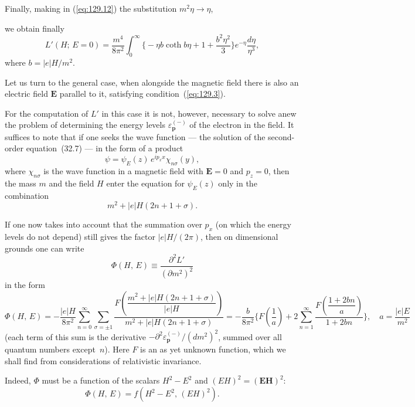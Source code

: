 Finally, making in (\ref{eq:129.12}) the substitution $m^2\eta\to\eta$,


\noindent we obtain finally
\begin{equation}
L'(H;\,E=0) = \frac{m^4}{8\pi^2}\int_0^{\infty}\biggl\{-\eta b\coth b\eta + 1 + \frac{b^2\eta^2}{3}\biggr\}e^{-\eta}\frac{d\eta}{\eta^3},
\label{eq:129.13}
\end{equation}
where $b = |e|H/m^2$.

Let us turn to the general case, when alongside the magnetic field there is also an electric field $\mathbf{E}$ parallel to it, satisfying condition~(\ref{eq:129.3}).

For the computation of $L'$ in this case it is not, however, necessary to solve anew the problem of determining the energy levels $\varepsilon_{\mathbf{p}}^{(-)}$ of the electron in the field. It suffices to note that if one seeks the wave function --- the solution of the second-order equation~(32.7) --- in the form of a product
\[
\psi = \psi_E(z)\,e^{ip_x x}\chi_{n\sigma}(y),
\]
where $\chi_{n\sigma}$ is the wave function in a magnetic field with $\mathbf{E}=0$ and $p_z = 0$, then the mass $m$ and the field $H$ enter the equation for $\psi_E(z)$ only in the combination
\[
m^2 + |e|H(2n+1+\sigma).
\]

If one now takes into account that the summation over $p_x$ (on which the energy levels do not depend) still gives the factor $|e|H/(2\pi)$, then on dimensional grounds one can write
\[
\Phi(H,\,E) \equiv \frac{\partial^2 L'}{(\partial m^2)^2}
\]
in the form
\begin{equation}
\Phi(H,\,E) = -\frac{|e|H}{8\pi^2}\sum_{n=0}^{\infty}\sum_{\sigma=\pm 1}\frac{F\!\left(\dfrac{m^2+|e|H(2n+1+\sigma)}{|e|H}\right)}{m^2+|e|H(2n+1+\sigma)} = -\frac{b}{8\pi^2}\biggl\{F\!\left(\frac{1}{a}\right) + 2\sum_{n=1}^{\infty}\frac{F\!\left(\dfrac{1+2bn}{a}\right)}{1+2bn}\biggr\},\quad a = \frac{|e|E}{m^2}
\label{eq:129.14}
\end{equation}
(each term of this sum is the derivative $-\partial^2\varepsilon_{\mathbf{p}}^{(-)}/(dm^2)^2$, summed over all quantum numbers except~$n$). Here $F$ is an as yet unknown function, which we shall find from considerations of relativistic invariance.

Indeed, $\Phi$ must be a function of the scalars $H^2 - E^2$ and $(EH)^2 = (\mathbf{E}\mathbf{H})^2$:
\[
\Phi(H,\,E) = f(H^2-E^2,\,(EH)^2).
\]


